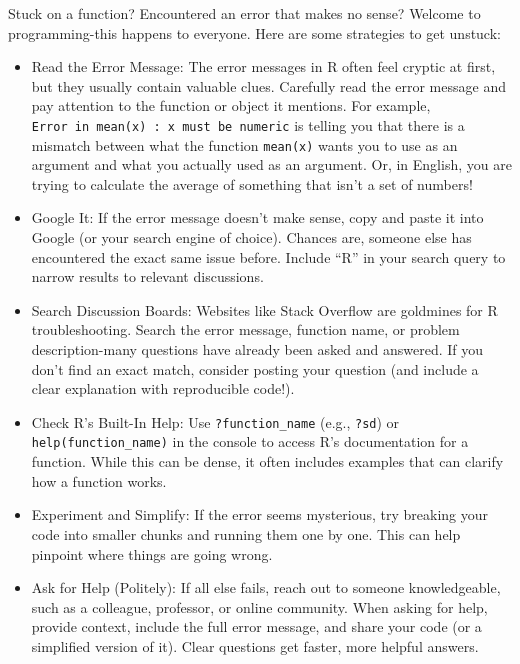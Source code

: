 \documentclass[
  letterpaper,
]{book}
\begin{document}
\begin{tcolorbox}[enhanced jigsaw, colframe=quarto-callout-tip-color-frame, breakable, arc=.35mm, bottomtitle=1mm, bottomrule=.15mm, colbacktitle=quarto-callout-tip-color!10!white, rightrule=.15mm, colback=white, opacityback=0, opacitybacktitle=0.6, coltitle=black, left=2mm, toptitle=1mm, toprule=.15mm, titlerule=0mm, leftrule=.75mm, title=\textcolor{quarto-callout-tip-color}{\faLightbulb}\hspace{0.5em}{Tip from the Helpdesk: Help! I Need Somebody!}]

Stuck on a function? Encountered an error that makes no sense? Welcome
to programming-this happens to everyone. Here are some strategies to get
unstuck:

\begin{itemize}
\item
  Read the Error Message: The error messages in R often feel cryptic at
  first, but they usually contain valuable clues. Carefully read the
  error message and pay attention to the function or object it mentions.
  For example,
  \texttt{Error\ in\ mean(x)\ :\ \textquotesingle{}x\textquotesingle{}\ must\ be\ numeric}
  is telling you that there is a mismatch between what the function
  \texttt{mean(x)} wants you to use as an argument and what you actually
  used as an argument. Or, in English, you are trying to calculate the
  average of something that isn't a set of numbers!
\item
  Google It: If the error message doesn't make sense, copy and paste it
  into Google (or your search engine of choice). Chances are, someone
  else has encountered the exact same issue before. Include ``R'' in
  your search query to narrow results to relevant discussions.
\item
  Search Discussion Boards: Websites like Stack Overflow are goldmines
  for R troubleshooting. Search the error message, function name, or
  problem description-many questions have already been asked and
  answered. If you don't find an exact match, consider posting your
  question (and include a clear explanation with reproducible code!).
\item
  Check R's Built-In Help: Use \texttt{?function\_name} (e.g.,
  \texttt{?sd}) or \texttt{help(function\_name)} in the console to
  access R's documentation for a function. While this can be dense, it
  often includes examples that can clarify how a function works.
\item
  Experiment and Simplify: If the error seems mysterious, try breaking
  your code into smaller chunks and running them one by one. This can
  help pinpoint where things are going wrong.
\item
  Ask for Help (Politely): If all else fails, reach out to someone
  knowledgeable, such as a colleague, professor, or online community.
  When asking for help, provide context, include the full error message,
  and share your code (or a simplified version of it). Clear questions
  get faster, more helpful answers.
\end{itemize}


\end{tcolorbox}
\end{document}
